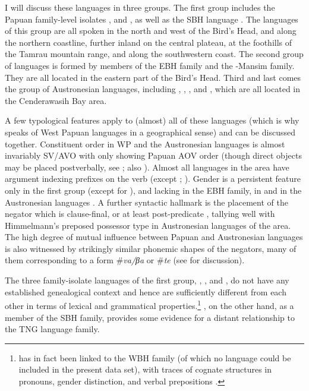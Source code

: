 I will discuss these languages in three groups. The first group includes the Papuan family-level isolates ,  and , as well as the \textsc{SBH} language . The languages of this group are all spoken in the north and west of the Bird's Head,  and  along the northern coastline,  further inland on the central plateau, at the foothills of the Tamrau mountain range, and  along the southwestern coast. The second group of languages is formed by members of the EBH family and the -Mansim family. They are all located in the eastern part of the Bird's Head. Third and last comes the group of Austronesian languages, including , , , and , which are all located in the Cenderawasih Bay area.

A few typological features apply to (almost) all of these languages (which is why \citealt{reesink2005west} speaks of West Papuan languages in a geographical sense) and can be discussed together. Constituent order in WP  and the Austronesian languages is almost invariably SV/AVO with only  showing Papuan AOV order (though direct objects may be placed postverbally, see \citealt[195]{reesink2005west}; also \citealt[52f.]{devries2004}). Almost all languages in the area have argument indexing prefixes on the verb (except ; \citealt[5]{dol2007grammar}). Gender is a persistent feature only in the first group (except for ), and lacking in the \textsc{EBH} family, in  and in the Austronesian languages \citep[205]{reesink2005west}. A further syntactic hallmark is the placement of the negator which is clause-final, or at least post-predicate \citep[199]{reesink2005west}, tallying well with Himmelmann's  preposed possessor type in Austronesian languages of the area. The high degree of mutual influence between Papuan and Austronesian languages is also witnessed by strikingly similar phonemic shapes of the negators, many of them corresponding to a form \#\textit{va/βa} or \#\textit{te} (see  \citealt[199]{reesink2005west} for discussion).

The three family-isolate languages of the first group, , , and , do not have any established genealogical context and hence are sufficiently different from each other in terms of lexical and grammatical properties.\footnote{ has in fact been linked to the \textsc{WBH} family (of which no language could be included in the present data set), with traces of cognate structures in pronouns, gender distinction, and verbal prepositions \citep[187]{reesink2005west}.} , on the other hand, as a member of the SBH family, provides some evidence for a distant relationship to the TNG language family. 

